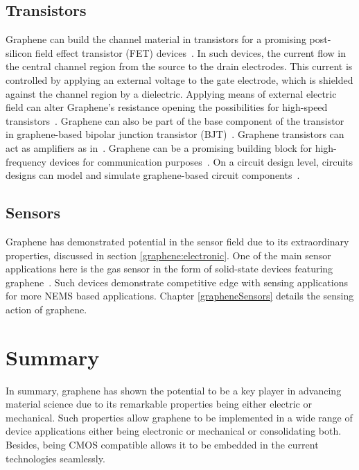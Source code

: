\subsection{Transistors}
Graphene can build the channel material in transistors for a promising post-silicon field effect transistor (FET) devices~\cite{Lemme2007, Smith2016a}. In such devices, the current flow in the central channel region from the source to the drain electrodes. This current is controlled by applying an external voltage to the gate electrode, which is shielded against the channel region by a dielectric. Applying means of external electric field can alter Graphene's resistance opening the possibilities for high-speed transistors~\cite{Schwierz2010}. Graphene can also be part of the base component of the transistor in graphene-based bipolar junction transistor (BJT)~\cite{Vaziri2013}. Graphene transistors can act as amplifiers as in~\cite{Han2011}. Graphene can be a promising building block for high-frequency devices for communication purposes~\cite{Smith2016a, Liao2012}. On a circuit design level, circuits designs can model and simulate graphene-based circuit components~\cite{Han2011, Wu2012, Thiele2010, Fregonese2013, Rodriguez2014}.
\subsection{Sensors}
\label{graphene:sensor}
Graphene has demonstrated potential in the sensor field due to its extraordinary properties, discussed in section \ref{graphene:electronic}. One of the main sensor applications here is the gas sensor in the form of solid-state devices featuring graphene~\cite{Moseley1997, Handbook_gas_sensing, Capone2003, Smith2016a, Elgammal2016Lic}. Such devices demonstrate competitive edge with sensing applications for more NEMS based applications. Chapter \ref{grapheneSensors} details the sensing action of graphene.
\section{Summary}
In summary, graphene has shown the potential to be a key player in advancing material science due to its remarkable properties being either electric or mechanical. Such properties allow graphene to be implemented in a wide range of device applications either being electronic or mechanical or consolidating both. Besides, being CMOS compatible allows it to be embedded in the current technologies seamlessly.
\endinput